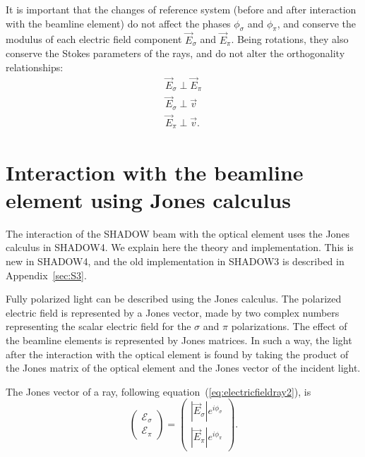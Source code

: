 \documentclass{iucr}
\begin{document}
It is important that the changes of reference system (before and after interaction with the beamline element) do not affect the phases $\phi_\sigma$ and $\phi_\pi$, and conserve the modulus of each electric field component $\vec{E}_\sigma$ and $\vec{E}_\pi$. Being rotations, they also conserve the Stokes parameters of the rays, and do not alter the orthogonality relationships:
\begin{eqnarray}
\label{ortho}
\vec{E}_\sigma \perp \vec{E}_\pi \nonumber \\
\vec{E}_\sigma \perp \vec{v} \nonumber \\
\vec{E}_\pi \perp \vec{v}.
\end{eqnarray}


\section{Interaction with the beamline element using Jones calculus}
\label{sec:S4}

The interaction of the SHADOW beam with the optical element  uses the Jones calculus \cite{Jones1941a, Jones1941b} in SHADOW4. We explain here the theory and implementation. This is new in SHADOW4, and the old implementation in SHADOW3 is described in Appendix~\ref{sec:S3}.

Fully polarized light can be described using the Jones calculus. The polarized electric field is represented by a Jones vector, made by two complex numbers representing the scalar electric field for the $\sigma$ and $\pi$ polarizations. 
The effect of the beamline elements is represented by Jones matrices.
In such a way, the light after the interaction with the optical element is found by taking the product of the Jones matrix of the optical element and the Jones vector of the incident light.

The Jones vector of a ray, following equation~(\ref{eq:electricfieldray2}), is
\begin{equation}
        \begin{pmatrix}
        \mathcal{E}_\sigma \\
        \mathcal{E}_\pi
    \end{pmatrix}
    =
    \begin{pmatrix}
        |\vec{E}_{\sigma}| e^{i \phi_\sigma} \\
        |\vec{E}_{\pi}| e^{i \phi_\pi}
    \end{pmatrix}.
\end{equation}
\end{document}
